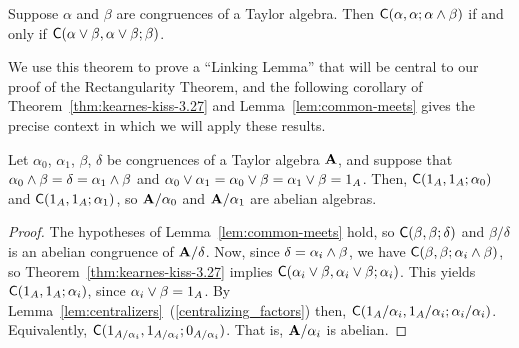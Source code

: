   \begin{theorem} 
    \label{thm:kearnes-kiss-3.27}
    Suppose $\alpha$ and $\beta$ are congruences of a Taylor algebra. Then
    $\mathsf{C}(\alpha,  \alpha;  \alpha \wedge \beta)$ if and only if
    $\mathsf{C}(\alpha \vee \beta,  \alpha \vee \beta;  \beta)$.
  \end{theorem}
  \noindent We use this theorem to prove a 
  ``Linking Lemma'' that will be central to our proof of the Rectangularity
  Theorem, and the following corollary of Theorem~\ref{thm:kearnes-kiss-3.27} and 
  Lemma~\ref{lem:common-meets} gives the precise context in which we will apply 
  these results.
  \begin{corollary}
    \label{cor:common-meets}
    Let $\alpha_0$, $\alpha_1$, $\beta$, $\delta$ be congruences of a Taylor 
    algebra $\mathbf{A}$, and suppose that 
    $\alpha_0 \wedge \beta = \delta = \alpha_1 \wedge \beta$ and
    $\alpha_0 \vee \alpha_1 = \alpha_0 \vee \beta =\alpha_1 \vee\beta =1_A$.
    Then, $\mathsf{C}(1_A,  1_A;  \alpha_0)$ and $\mathsf{C}(1_A,  1_A;  \alpha_1)$,
      so $\mathbf{A}/\alpha_0$ and $\mathbf{A}/\alpha_1$ are abelian algebras.
  \end{corollary}
  \begin{proof}
    The hypotheses of Lemma~\ref{lem:common-meets} hold, so
    $\mathsf{C}(\beta, \beta; \delta)$ and 
    $\beta/\delta$ is an abelian congruence of $\mathbf{A}/\delta$. 
    Now, since $\delta = \alpha_i \wedge \beta$, 
    we have $\mathsf{C}(\beta,  \beta;  \alpha_i \wedge \beta)$, so 
    Theorem~\ref{thm:kearnes-kiss-3.27} implies
    $\mathsf{C}(\alpha_i\vee \beta,  \alpha_i\vee \beta;  \alpha_i)$.
    This yields
    $\mathsf{C}(1_A,  1_A;  \alpha_i)$, 
    since $\alpha_i \vee \beta =1_A$.  By 
    Lemma~\ref{lem:centralizers}~(\ref{centralizing_factors}) then,
    $\mathsf{C}(1_A/\alpha_i,  1_A/\alpha_i;  \alpha_i/\alpha_i)$.
    Equivalently,
    $\mathsf{C}(1_{A/\alpha_i},  1_{A/\alpha_i};  0_{A/\alpha_i})$. That is, $\mathbf{A}/\alpha_i$ is abelian.
  \end{proof}

